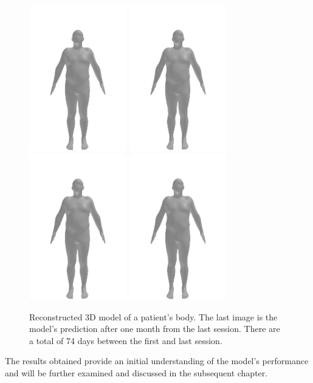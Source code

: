 \begin{figure}[h]
	\includegraphics[width=120pt]{files/patients/2_9}
	\includegraphics[width=120pt]{files/patients/2_10}
	\includegraphics[width=120pt]{files/patients/2_11}
	\linebreak
	\includegraphics[width=120pt]{files/patients/2_predicted}
	\caption[Reconstructed 3D model of the patient's body.]{Reconstructed 3D model of a patient's body. The last image is the model's prediction after one month from the last session. There are a total of 74 days between the first and last session.}
	\label{fig:patient-body-model}
\end{figure}

The results obtained provide an initial understanding of the model's
performance and will be further examined and discussed in the subsequent
chapter.